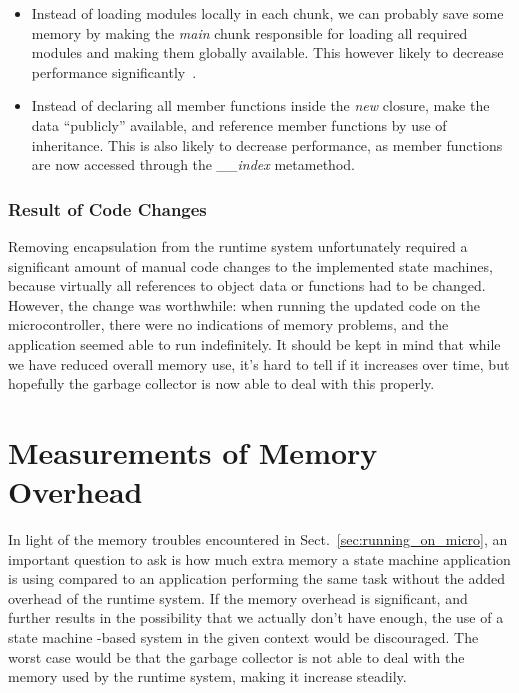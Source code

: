 \begin{itemize}
	\item Instead of loading modules locally in each chunk, we can probably save some memory by making the \emph{main} chunk responsible for loading all required modules and making them globally available. This however likely to decrease performance significantly~\cite{chapter:lua_performance_tips}.
	\item Instead of declaring all member functions inside the \emph{new} closure, make the data ``publicly'' available, and reference member functions by use of inheritance. This is also likely to decrease performance, as member functions are now accessed through the \emph{\_\_index} metamethod.
\end{itemize}

\subsubsection{Result of Code Changes}
Removing encapsulation from the runtime system unfortunately required a significant amount of manual code changes to the implemented state machines, because virtually all references to object data or functions had to be changed. However, the change was worthwhile: when running the updated code on the microcontroller, there were no indications of memory problems, and the application seemed able to run indefinitely. It should be kept in mind that while we have reduced overall memory use, it's hard to tell if it increases over time, but hopefully the garbage collector is now able to deal with this properly.

\section{Measurements of Memory Overhead}
\label{sec:memory_overhead_measure}
In light of the memory troubles encountered in Sect.~\ref{sec:running_on_micro}, an important question to ask is how much extra memory a state machine application is using compared to an application performing the same task without the added overhead of the runtime system. If the memory overhead is significant, and further results in the possibility that we actually don't have enough, the use of a state machine -based system in the given context would be discouraged. The worst case would be that the garbage collector is not able to deal with the memory used by the runtime system, making it increase steadily.

